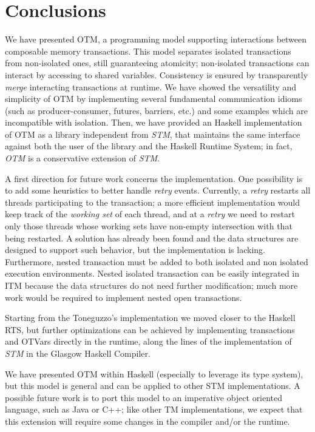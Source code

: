 
\chapter{Conclusions}
\label{chap:conc}

We have presented OTM, a programming model supporting  interactions between composable memory transactions.
This model separates isolated transactions from non-isolated ones, still guaranteeing atomicity; non-isolated transactions can interact by accessing to shared variables.
Consistency is ensured by transparently \emph{merge} interacting transactions at runtime.  
We have showed the versatility and simplicity of OTM by implementing several fundamental communication idioms (such as producer-consumer, futures, barriers, etc.) and some examples which are incompatible with isolation.
Then, we have provided an Haskell implementation of OTM as a library independent from \emph{STM}, that maintains the same interface against both the user of the library and the Haskell Runtime System; in fact, \emph{OTM} is a conservative extension of \emph{STM}.

A first direction for future work concerns the implementation.
One possibility is to add some heuristics to better handle \emph{retry} events.
Currently, a \emph{retry} restarts all threads participating to the transaction; a more efficient implementation would keep track of the \emph{working set} of each thread, and at a \emph{retry} we need to restart only those threads whose working sets have non-empty intersection with that being restarted.
A solution has already been found and the data structures are designed to support such behavior, but the implementation is lacking.
Furthermore, nested transaction must be added to both isolated and non isolated execution environments.
Nested isolated transaction can be easily integrated in ITM because the data structures do not need further modification; much more work would be required to implement nested open transactions.

Starting from the Toneguzzo's implementation we moved closer to the Haskell RTS, but further optimizations can be achieved by implementing transactions and OTVars directly in the runtime, along the lines of the implementation of \emph{STM} in the Glasgow Haskell Compiler.

We have presented OTM within Haskell (especially to leverage its type system), but this model is general and can be applied to other STM implementations. A possible future work is to port this model to an imperative object oriented language, such as Java or C++; like other TM implementations, we expect that this extension will require some changes in the compiler and/or the runtime. 